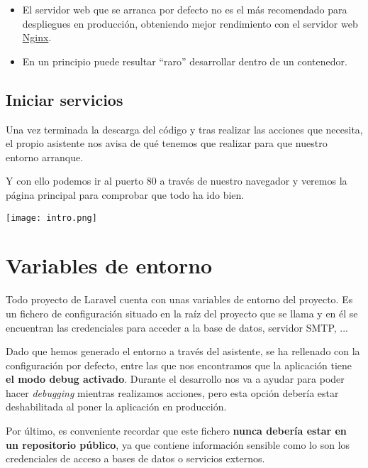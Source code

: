 \begin{itemize}
    \item El servidor web que se arranca por defecto no es el más recomendado para despliegues en producción, obteniendo mejor rendimiento con el servidor web \href{https://nginx.org/en/}{Nginx}.

    \item En un principio puede resultar “raro” desarrollar dentro de un contenedor.
\end{itemize}


\section{Iniciar servicios}

Una vez terminada la descarga del código y tras realizar las acciones que necesita, el propio asistente nos avisa de qué tenemos que realizar para que nuestro entorno arranque.


Y con ello podemos ir al puerto 80 a través de nuestro navegador y veremos la página principal para comprobar que todo ha ido bien.

\begin{center}
    \texttt{[image: intro.png]}
\end{center}


\chapter{Variables de entorno}
Todo proyecto de Laravel cuenta con unas variables de entorno del proyecto. Es un fichero de configuración situado en la raíz del proyecto que se llama  y en él se encuentran las credenciales para acceder a la base de datos, servidor SMTP, ...

Dado que hemos generado el entorno a través del asistente, se ha rellenado con la configuración por defecto, entre las que nos encontramos que la aplicación tiene \textbf{el modo debug activado}. Durante el desarrollo nos va a ayudar para poder hacer \textit{debugging} mientras realizamos acciones, pero esta opción debería estar deshabilitada al poner la aplicación en producción.

Por último, es conveniente recordar que este fichero \textbf{nunca debería estar en un repositorio público}, ya que contiene información sensible como lo son los credenciales de acceso a bases de datos o servicios externos.

